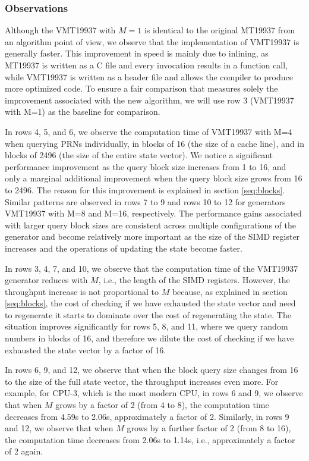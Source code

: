 \documentclass[preprint,1p,times]{elsarticle}
\begin{document}
			\subsubsection{Observations}
			Although the VMT19937 with $M\!=\!1$ is identical to the original MT19937 from an algorithm point of view, we observe that the implementation of VMT19937 is generally faster. This improvement in speed is mainly due to inlining, as MT19937 is written as a C file and every invocation results in a function call, while VMT19937 is written as a header file and allows the compiler to produce more optimized code. To ensure a fair comparison that measures solely the improvement associated with the new algorithm, we will use row 3 (VMT19937 with M=1) as the baseline for comparison.
			
			In rows 4, 5, and 6, we observe the computation time of VMT19937 with M=4 when querying PRNs individually, in blocks of 16 (the size of a cache line), and in blocks of 2496 (the size of the entire state vector). We notice a significant performance improvement as the query block size increases from 1 to 16, and only a marginal additional improvement when the query block size grows from 16 to 2496. The reason for this improvement is explained in section \ref{seq:blocks}. Similar patterns are observed in rows 7 to 9 and rows 10 to 12 for generators VMT19937 with M=8 and M=16, respectively. The performance gains associated with larger query block sizes are consistent across multiple configurations of the generator and become relatively more important as the size of the SIMD register increases and the operations of updating the state become faster.
			
			In rows 3, 4, 7, and 10, we observe that the computation time of the VMT19937 generator reduces with $M$, i.e., the length of the SIMD registers. However, the throughput increase is not proportional to $M$ because, as explained in section \ref{seq:blocks}, the cost of checking if we have exhausted the state vector and need to regenerate it starts to dominate over the cost of regenerating the state. The situation improves significantly for rows 5, 8, and 11, where we query random numbers in blocks of 16, and therefore we dilute the cost of checking if we have exhausted the state vector by a factor of 16.
			
			In rows 6, 9, and 12, we observe that when the block query size changes from 16 to the size of the full state vector, the throughput increases even more. For example, for CPU-3, which is the most modern CPU, in rows 6 and 9, we observe that when $M$ grows by a factor of 2 (from 4 to 8), the computation time decreases from 4.59s to 2.06s, approximately a factor of 2. Similarly, in rows 9 and 12, we observe that when $M$ grows by a further factor of 2 (from 8 to 16), the computation time decreases from 2.06s to 1.14s, i.e., approximately a factor of 2 again.
			
\end{document}
